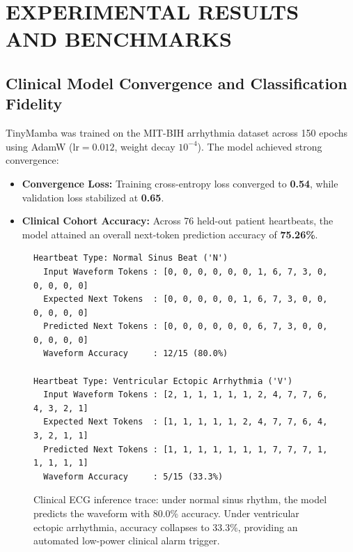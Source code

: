\documentclass[11pt,a4paper,oneside]{report}
\begin{document}
\chapter{EXPERIMENTAL RESULTS AND BENCHMARKS}
\label{Chapter6}
\rhead{}

\section{Clinical Model Convergence and Classification Fidelity}
TinyMamba was trained on the MIT-BIH arrhythmia dataset across 150 epochs using AdamW ($\text{lr}=0.012$, weight decay $10^{-4}$). The model achieved strong convergence:
\begin{itemize}
    \item \textbf{Convergence Loss:} Training cross-entropy loss converged to \textbf{0.54}, while validation loss stabilized at \textbf{0.65}.
    \item \textbf{Clinical Cohort Accuracy:} Across 76 held-out patient heartbeats, the model attained an overall next-token prediction accuracy of \textbf{75.26\%}.
\end{itemize}

\begin{figure}[!htbp]
    \centering
    \begin{framed}
    \footnotesize
    \begin{verbatim}
Heartbeat Type: Normal Sinus Beat ('N')
  Input Waveform Tokens : [0, 0, 0, 0, 0, 0, 1, 6, 7, 3, 0, 0, 0, 0, 0]
  Expected Next Tokens  : [0, 0, 0, 0, 0, 1, 6, 7, 3, 0, 0, 0, 0, 0, 0]
  Predicted Next Tokens : [0, 0, 0, 0, 0, 0, 6, 7, 3, 0, 0, 0, 0, 0, 0]
  Waveform Accuracy     : 12/15 (80.0%)

Heartbeat Type: Ventricular Ectopic Arrhythmia ('V')
  Input Waveform Tokens : [2, 1, 1, 1, 1, 1, 2, 4, 7, 7, 6, 4, 3, 2, 1]
  Expected Next Tokens  : [1, 1, 1, 1, 1, 2, 4, 7, 7, 6, 4, 3, 2, 1, 1]
  Predicted Next Tokens : [1, 1, 1, 1, 1, 1, 1, 7, 7, 7, 1, 1, 1, 1, 1]
  Waveform Accuracy     : 5/15 (33.3%)
    \end{verbatim}
    \end{framed}
    \caption[Clinical ECG Inference Demonstration on Normal and Arrhythmia Beats]{Clinical ECG inference trace: under normal sinus rhythm, the model predicts the waveform with 80.0\% accuracy. Under ventricular ectopic arrhythmia, accuracy collapses to 33.3\%, providing an automated low-power clinical alarm trigger.}
    \label{fig:ecg_trace}
\end{figure}
\end{document}
